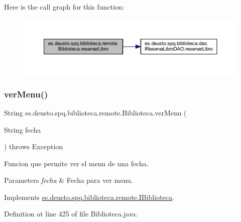 Here is the call graph for this function\+:
\nopagebreak
\begin{figure}[H]
\begin{center}
\leavevmode
\includegraphics[width=350pt]{classes_1_1deusto_1_1spq_1_1biblioteca_1_1remote_1_1_biblioteca_aabb7d3ecb5206da47fc6c4fa315e4c6e_cgraph}
\end{center}
\end{figure}
\mbox{\label{classes_1_1deusto_1_1spq_1_1biblioteca_1_1remote_1_1_biblioteca_ad964168fdca53a12ab747247617f41c7}} 
\subsubsection{\texorpdfstring{ver\+Menu()}{verMenu()}}
{\footnotesize\ttfamily String es.\+deusto.\+spq.\+biblioteca.\+remote.\+Biblioteca.\+ver\+Menu (\begin{DoxyParamCaption}\item[{String}]{fecha }\end{DoxyParamCaption}) throws Exception}

Funcion que permite ver el menu de una fecha. 
\begin{DoxyParams}{Parameters}
{\em fecha} & Fecha para ver menu. \\
\hline
\end{DoxyParams}


Implements \mbox{\hyperlink{interfacees_1_1deusto_1_1spq_1_1biblioteca_1_1remote_1_1_i_biblioteca_a7a9df6fad07fe2cfe50c261b5e048365}{es.\+deusto.\+spq.\+biblioteca.\+remote.\+I\+Biblioteca}}.



Definition at line 425 of file Biblioteca.\+java.

